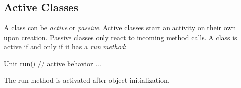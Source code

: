 \subsection{Active Classes}
\label{sec:active-classes}

A class can be \emph{active} or \emph{passive}.  Active classes start an
activity on their own upon creation. Passive classes only react to
incoming method calls. A class is active if and only if it has a \emph{run method}:
\begin{absexample}
Unit run() {
  // active behavior ...
}
\end{absexample}
The run method is activated after object initialization.  
